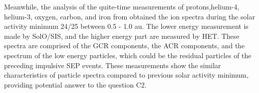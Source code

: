 Meanwhile, the analysis of the quite-time measurements of protons,helium-4, helium-3, oxygen, carbon, and iron from \citet{Mason-2021-SolOQuietTime} obtained the ion spectra during the solar activity minimum 24/25 between 0.5 - 1.0 au. The lower energy measurement is made by \acs{SolO}/\acs{SIS}, and the higher energy part are measured by \acs{HET}. These spectra are comprised of the \ac{GCR} components, the \ac{ACR} components, and the spectrum of the low energy particles, which could be the residual particles of the preceding impulsive \acs{SEP} events. These measurements show the similar characteristics of particle spectra compared to previous solar activity minimum, providing potential answer to the question C2.




